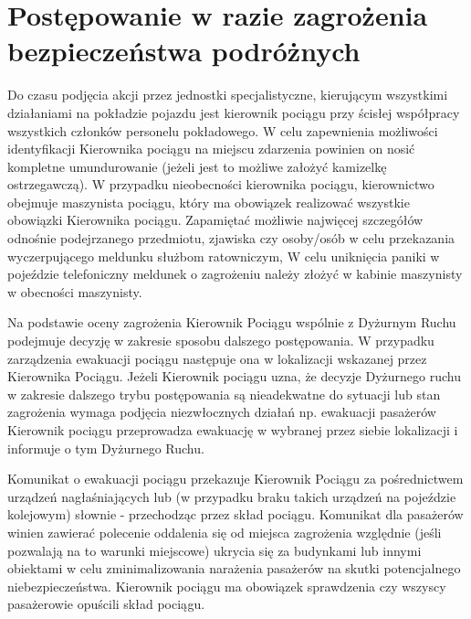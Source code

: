 \chapter{Postępowanie w razie zagrożenia bezpieczeństwa podróżnych}
Do czasu podjęcia akcji przez jednostki specjalistyczne, kierującym wszystkimi działaniami na pokładzie pojazdu jest kierownik pociągu przy ścisłej współpracy wszystkich członków personelu pokładowego. 
W celu zapewnienia możliwości identyfikacji Kierownika pociągu na miejscu zdarzenia powinien on nosić kompletne umundurowanie (jeżeli jest to możliwe założyć kamizelkę ostrzegawczą). 
W przypadku nieobecności kierownika pociągu, kierownictwo obejmuje maszynista pociągu, który ma obowiązek realizować wszystkie obowiązki Kierownika pociągu.
Zapamiętać możliwie najwięcej szczegółów odnośnie podejrzanego przedmiotu, zjawiska czy osoby/osób w celu przekazania wyczerpującego meldunku służbom ratowniczym,
W celu uniknięcia paniki w pojeździe telefoniczny meldunek o zagrożeniu należy złożyć w kabinie maszynisty w obecności maszynisty.

Na podstawie oceny zagrożenia Kierownik Pociągu wspólnie z Dyżurnym Ruchu podejmuje decyzję w zakresie sposobu dalszego postępowania. W przypadku zarządzenia ewakuacji pociągu następuje ona w lokalizacji wskazanej przez Kierownika Pociągu.
Jeżeli Kierownik pociągu uzna, że decyzje Dyżurnego ruchu w zakresie dalszego trybu postępowania są nieadekwatne do sytuacji lub stan zagrożenia wymaga podjęcia niezwłocznych działań np. ewakuacji pasażerów Kierownik pociągu przeprowadza ewakuację w wybranej przez siebie lokalizacji i informuje o tym Dyżurnego Ruchu.

Komunikat o ewakuacji pociągu przekazuje Kierownik Pociągu za pośrednictwem urządzeń
nagłaśniających lub (w przypadku braku takich urządzeń na pojeździe kolejowym) słownie - przechodząc przez skład pociągu.
Komunikat dla pasażerów winien zawierać polecenie oddalenia się od miejsca zagrożenia
względnie (jeśli pozwalają na to warunki miejscowe) ukrycia się za budynkami lub innymi obiektami w celu zminimalizowania narażenia pasażerów na skutki potencjalnego niebezpieczeństwa. Kierownik pociągu ma obowiązek sprawdzenia czy wszyscy pasażerowie opuścili skład pociągu.


